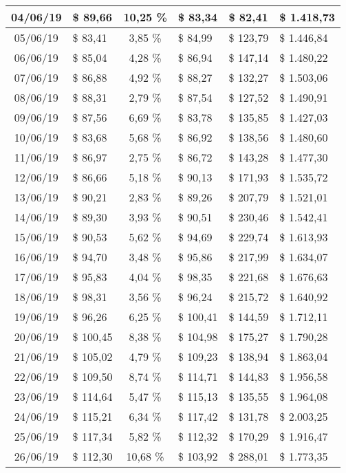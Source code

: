 \begin{center}
\begin{small}
\begin{longtable}{|c|l|c|l|l|l|}
04/06/19 & \$ 89,66 & 10,25 \% & \$ 83,34 & \$ 82,41 & \$ 1.418,73 \\ \hline
05/06/19 & \$ 83,41 & 3,85 \% & \$ 84,99 & \$ 123,79 & \$ 1.446,84 \\ \hline
06/06/19 & \$ 85,04 & 4,28 \% & \$ 86,94 & \$ 147,14 & \$ 1.480,22 \\ \hline
07/06/19 & \$ 86,88 & 4,92 \% & \$ 88,27 & \$ 132,27 & \$ 1.503,06 \\ \hline
08/06/19 & \$ 88,31 & 2,79 \% & \$ 87,54 & \$ 127,52 & \$ 1.490,91 \\ \hline
09/06/19 & \$ 87,56 & 6,69 \% & \$ 83,78 & \$ 135,85 & \$ 1.427,03 \\ \hline
10/06/19 & \$ 83,68 & 5,68 \% & \$ 86,92 & \$ 138,56 & \$ 1.480,60 \\ \hline
11/06/19 & \$ 86,97 & 2,75 \% & \$ 86,72 & \$ 143,28 & \$ 1.477,30 \\ \hline
12/06/19 & \$ 86,66 & 5,18 \% & \$ 90,13 & \$ 171,93 & \$ 1.535,72 \\ \hline
13/06/19 & \$ 90,21 & 2,83 \% & \$ 89,26 & \$ 207,79 & \$ 1.521,01 \\ \hline
14/06/19 & \$ 89,30 & 3,93 \% & \$ 90,51 & \$ 230,46 & \$ 1.542,41 \\ \hline
15/06/19 & \$ 90,53 & 5,62 \% & \$ 94,69 & \$ 229,74 & \$ 1.613,93 \\ \hline
16/06/19 & \$ 94,70 & 3,48 \% & \$ 95,86 & \$ 217,99 & \$ 1.634,07 \\ \hline
17/06/19 & \$ 95,83 & 4,04 \% & \$ 98,35 & \$ 221,68 & \$ 1.676,63 \\ \hline
18/06/19 & \$ 98,31 & 3,56 \% & \$ 96,24 & \$ 215,72 & \$ 1.640,92 \\ \hline
19/06/19 & \$ 96,26 & 6,25 \% & \$ 100,41 & \$ 144,59 & \$ 1.712,11 \\ \hline
20/06/19 & \$ 100,45 & 8,38 \% & \$ 104,98 & \$ 175,27 & \$ 1.790,28 \\ \hline
21/06/19 & \$ 105,02 & 4,79 \% & \$ 109,23 & \$ 138,94 & \$ 1.863,04 \\ \hline
22/06/19 & \$ 109,50 & 8,74 \% & \$ 114,71 & \$ 144,83 & \$ 1.956,58 \\ \hline
23/06/19 & \$ 114,64 & 5,47 \% & \$ 115,13 & \$ 135,55 & \$ 1.964,08 \\ \hline
24/06/19 & \$ 115,21 & 6,34 \% & \$ 117,42 & \$ 131,78 & \$ 2.003,25 \\ \hline
25/06/19 & \$ 117,34 & 5,82 \% & \$ 112,32 & \$ 170,29 & \$ 1.916,47 \\ \hline
26/06/19 & \$ 112,30 & 10,68 \% & \$ 103,92 & \$ 288,01 & \$ 1.773,35 \\ \hline

\end{longtable}
\end{small}
\end{center}
